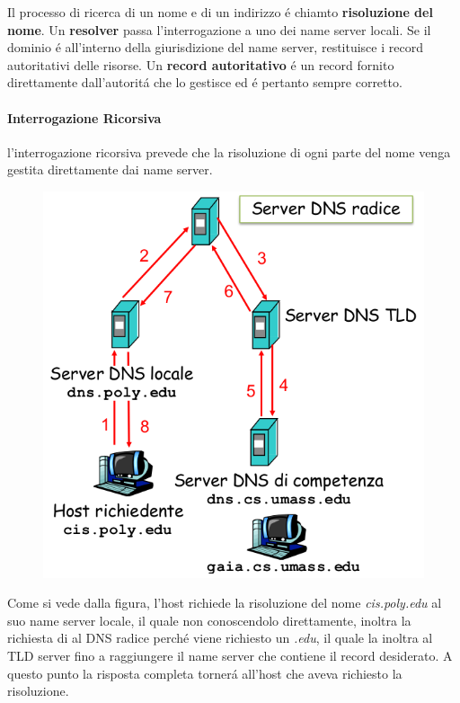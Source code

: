 \documentclass[12pt]{article}
\begin{document}
Il processo di ricerca di un nome e di un indirizzo \'e chiamto \textbf{risoluzione del nome}. Un \textbf{resolver} passa 
l'interrogazione a uno dei name server locali. Se il dominio \'e all'interno della giurisdizione del name server, restituisce i 
record autoritativi delle risorse. Un \textbf{record autoritativo} \'e un record fornito direttamente dall'autorit\'a che lo 
gestisce ed \'e pertanto sempre corretto.

\paragraph{Interrogazione Ricorsiva} l'interrogazione ricorsiva prevede che la risoluzione di ogni parte del nome venga gestita 
direttamente dai name server.
\begin{figure}
  \begin{center}
    \includegraphics[scale=0.3]{applicazione-img5.png}
  \end{center}
\end{figure}
Come si vede dalla figura, l'host richiede la risoluzione del nome \textit{cis.poly.edu} al suo name server locale, il quale non 
conoscendolo direttamente, inoltra la richiesta di al DNS radice perch\'e viene richiesto un \textit{.edu}, il quale la inoltra 
al TLD server fino a raggiungere il name server che contiene il record desiderato. A questo punto la risposta completa torner\'a 
all'host che aveva richiesto la risoluzione.
\end{document}
